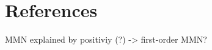 \documentclass[stu,a4paper,11pt,floatsintext]{apa7}
\begin{document}
















\newpage

\hypertarget{references}{%
\section{References}\label{references}}

MMN explained by positiviy (?) -\textgreater{} first-order MMN?
\end{document}
